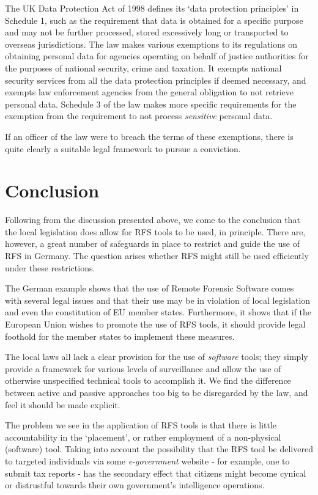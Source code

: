 \documentclass[11pt]{article} %
\begin{document}
The UK Data Protection Act of 1998 defines its `data protection principles' in Schedule 1, such as the requirement that data is obtained for a specific purpose and may not be further processed, stored excessively long or transported to overseas jurisdictions. \cite{dpact}
The law makes various exemptions to its regulations on obtaining personal data for agencies operating on behalf of justice authorities for the purposes of national security, crime and taxation.
It exempts national security services from all the data protection principles if deemed necessary, and exempts law enforcement agencies from the general obligation to not retrieve personal data.
Schedule 3 of the law makes more specific requirements for the exemption from the requirement to not process \textit{sensitive} personal data.

If an officer of the law were to breach the terms of these exemptions, there is quite clearly a suitable legal framework to pursue a conviction.

\section{Conclusion}
Following from the discussion presented above, we come to the conclusion that the local legislation does allow for RFS tools to be used, in principle.
There are, however, a great number of safeguards in place to restrict and guide the use of RFS in Germany.
The question arises whether RFS might still be used efficiently under these restrictions.

The German example shows that the use of Remote Forensic Software comes with several legal issues and that their use may be in violation of local legislation and even the constitution of EU member states.
Furthermore, it shows that if the European Union wishes to promote the use of RFS tools, it should provide legal foothold for the member states to implement these measures.

The local laws all lack a clear provision for the use of \textit{software} tools; they simply provide a framework for various levels of surveillance and allow the use of otherwise unspecified technical tools to accomplish it.
We find the difference between active and passive approaches too big to be disregarded by the law, and feel it should be made explicit.

The problem we see in the application of RFS tools is that there is little accountability in the `placement', or rather employment of a non-physical (software) tool.
Taking into account the possibility that the RFS tool be delivered to targeted individuals via some \textit{e-government} website - for example, one to submit tax reports - has the secondary effect that citizens might become cynical or distrustful towards their own government's intelligence operations.
\end{document}
